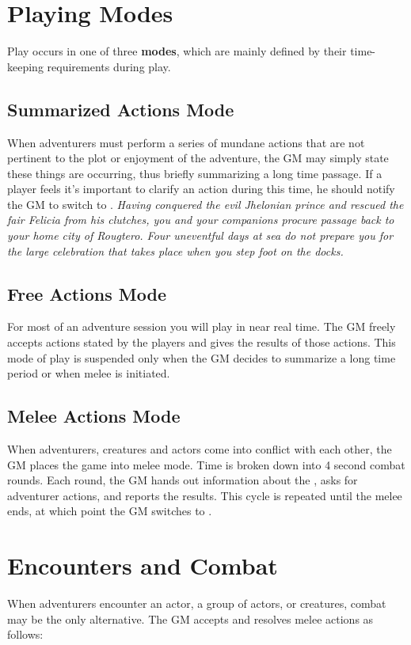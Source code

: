 \begin{multicols*}{2}
\section{Playing Modes}
Play occurs in one of three \textbf{modes}, which are mainly defined by their time-keeping requirements during play.
\subsection{Summarized Actions Mode}
When adventurers must perform a series of mundane actions that are not pertinent to the plot or  enjoyment of the adventure, the GM may simply state these things are occurring, thus briefly summarizing a long time passage. If a player feels it's important to clarify an action during this time, he should notify the GM to switch to .
\textit{Having conquered the evil Jhelonian prince and rescued the fair Felicia from his clutches, you and your 
companions procure passage back to your home city of Rougtero. Four uneventful days at sea do not prepare you for the large celebration that takes place when you step foot on the docks.}
\subsection{Free Actions Mode}
For most of an adventure session you will play in near real time. The GM freely accepts actions stated by the players and gives the results of those actions. This mode of play is suspended only when the GM decides to summarize a long time period or when melee is initiated.
\subsection{Melee Actions Mode}
When adventurers, creatures and actors come into conflict with each other, the GM places the game into melee mode. Time is broken down into 4 second combat rounds. Each round, the GM hands out information about the , asks for adventurer actions, and reports the results. This cycle is repeated until the melee ends, at which point the GM switches to .
\section{Encounters and Combat}
When adventurers encounter an actor, a group of actors, or creatures, combat may be the only alternative. The GM accepts and resolves melee actions as follows:

\end{multicols*}
